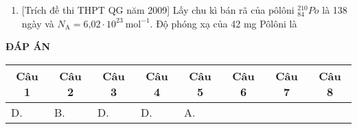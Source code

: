 \begin{enumerate}
{
	}
	\item{[Trích đề thi THPT QG năm 2009] Lấy chu kì bán rã của pôlôni $^{210}_{84}Po$ là 138 ngày và $N_{\text{A}} = \text{6,02} \cdot 10^{23}\ \text{mol}^{-1}$. Độ phóng xạ của 42 mg Pôlôni là 
	}
\end{enumerate}
\textbf{ĐÁP ÁN}
\begin{longtable}[\textwidth]{|p{}|p{}|p{}|p{}|p{}|p{}|p{}|p{}|}
	\hline%
	\multicolumn{1}{|c|}{\textbf{Câu 1}} & \multicolumn{1}{c|}{\textbf{Câu 2}} & \multicolumn{1}{c|}{\textbf{Câu 3}} &
	\multicolumn{1}{c|}{\textbf{Câu 4}} &
	\multicolumn{1}{c|}{\textbf{Câu 5}} &
	\multicolumn{1}{c|}{\textbf{Câu 6}} &
	\multicolumn{1}{c|}{\textbf{Câu 7}} &
	\multicolumn{1}{c|}{\textbf{Câu 8}} \\
	\hline
	D.&B. &D. &D. &A. & & &	\\
	\hline
	
\end{longtable} 